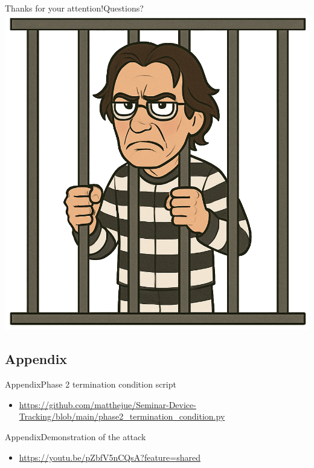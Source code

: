 \documentclass[aspectratio=169, hyperref={colorlinks=true, allcolors=SecondaryColor}, c]{beamer}
\begin{document}
	\begin{frame}{Thanks for your attention!}{Questions?}
    \includegraphics[height=0.7\paperheight, center]{./figures/computer_scientist_in_jail.png}
	\end{frame}
\else
\fi

\ifappendix
	\begin{withoutheadline}
	\section{Appendix}
	\end{withoutheadline}

	\begin{frame}[fragile]{Appendix}{Phase 2 termination condition script}
    \begin{itemize}
      \item \url{https://github.com/matthejue/Seminar-Device-Tracking/blob/main/phase2_termination_condition.py}
    \end{itemize}
	\end{frame}

	\begin{frame}[fragile]{Appendix}{Demonstration of the attack}
    \begin{itemize}
      \item \url{https://youtu.be/pZbfV5nCQsA?feature=shared}
    \end{itemize}
	\end{frame}
\else
\fi
\end{document}
